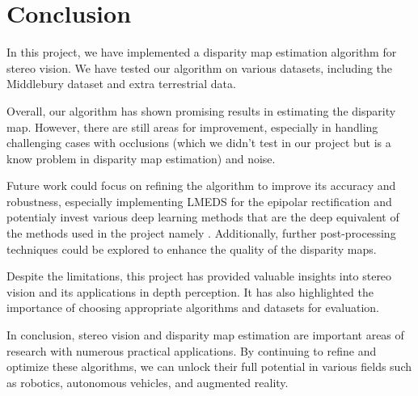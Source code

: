 \documentclass[10pt,twocolumn,letterpaper]{article}
\begin{document}
\section{Conclusion}
In this project, we have implemented a disparity map estimation algorithm for stereo vision. We have tested our algorithm on various datasets, including the Middlebury dataset and extra terrestrial data. 

Overall, our algorithm has shown promising results in estimating the disparity map. However, there are still areas for improvement, especially in handling challenging cases with occlusions (which we didn't test in our project but is a know problem in disparity map estimation) and noise. 

Future work could focus on refining the algorithm to improve its accuracy and robustness, especially implementing LMEDS for the epipolar rectification and potentialy invest various deep learning methods that are the deep equivalent of the methods used in the project namely \cite{lindebergScaleInvariantFeature2012} \cite{fischlerRandomSampleConsensus1981} \cite{hirschmullerAccurateEfficientStereo2005a}. Additionally, further post-processing techniques could be explored to enhance the quality of the disparity maps. 

Despite the limitations, this project has provided valuable insights into stereo vision and its applications in depth perception. It has also highlighted the importance of choosing appropriate algorithms and datasets for evaluation. 

In conclusion, stereo vision and disparity map estimation are important areas of research with numerous practical applications. By continuing to refine and optimize these algorithms, we can unlock their full potential in various fields such as robotics, autonomous vehicles, and augmented reality.


\newpage
\printbibliography
\end{document}
